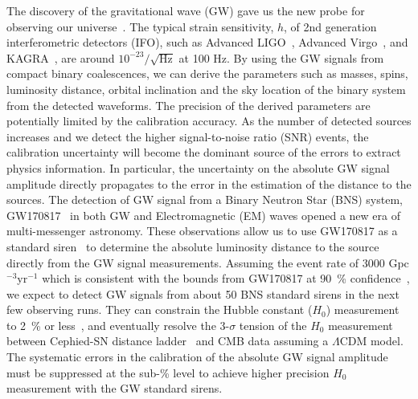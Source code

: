\documentclass[%
 reprint,
superscriptaddress,
 amsmath,amssymb,
 aps,
]{revtex4-1}
\begin{document}
The discovery of the gravitational wave (GW) gave us the new probe for observing our universe~\cite{PhysRevLett.116.061102}. 
The typical strain sensitivity, $h$, of 2nd generation interferometric detectors (IFO), such as Advanced LIGO~\cite{0264-9381-32-7-074001}, Advanced Virgo~\cite{0264-9381-32-2-024001}, and KAGRA~\cite{0264-9381-29-12-124007, PhysRevD.88.043007}, are around $10^{-23}/\sqrt{\mathrm{Hz}}$ at 100 Hz. 
By using the GW signals from compact binary coalescences, we can derive 
the parameters such as masses, spins, luminosity distance, orbital inclination 
and the sky location of the binary system from the detected waveforms. 
The precision of the derived parameters are potentially limited by the 
calibration accuracy. As the number of detected sources increases and we 
detect the higher signal-to-noise ratio (SNR) events, the calibration uncertainty 
will become the dominant source of the errors to extract physics information. 
In particular, the uncertainty on the absolute GW signal amplitude directly 
propagates to the error in the estimation of the distance to the sources. 
The detection of GW signal from a Binary Neutron Star (BNS) system, 
GW170817~\cite{PhysRevLett.119.161101} in both GW and Electromagnetic (EM) 
waves opened a new era of multi-messenger astronomy. These observations 
allow us to use GW170817 as a standard 
siren~\cite{Abbott:2017xzu,Schutz_1986,Holz_2005,Nissanke_2010} to 
determine the absolute luminosity distance to the source directly from the 
GW signal measurements. Assuming the event rate of 3000 Gpc$^{-3}$yr$^{-1}$ 
which is consistent with the bounds from GW170817 at 90~\% 
confidence~\cite{GW170817:2017aa}, we expect to detect GW signals from about 
50 BNS standard sirens in the next few observing runs. 
They can constrain the Hubble constant ($H_0$) 
measurement to 2~\% or less~\cite{Feeney:2018mkj}, and eventually resolve 
the 3-$\sigma$ tension of the $H_0$ measurement between Cephied-SN distance 
ladder~\cite{Riess_2016} and CMB data assuming a $\Lambda$CDM 
model.~\cite{2016-planck} The systematic errors in the calibration of 
the absolute GW signal amplitude must be suppressed at the sub-\% level to 
achieve higher precision $H_0$ measurement with the GW standard sirens.

\end{document}
